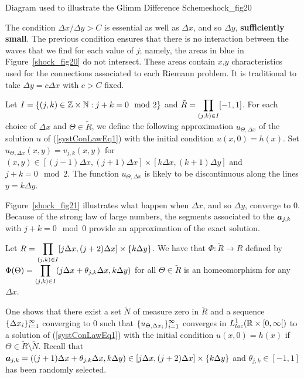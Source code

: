 {Diagram used to illustrate the Glimm Difference Scheme}{shock_fig20}

The condition $\Delta x / \Delta y > C$ is essential as well as
$\Delta x$, and so $\Delta y$, {\bfseries sufficiently small}.
The previous condition ensures that there is no interaction between
the waves that we find for each value of $j$; namely, the areas
in blue in Figure~\ref{shock_fig20} do not intersect.  These areas contain
$x$,$y$ characteristics used for the connections associated to each
Riemann problem.  It is traditional to take $\Delta y = c \Delta x$ with
$c>C$ fixed.

Let $I = \{ (j,k) \in \mathbb{Z} \times \mathbb{N} : j+k = 0 \mod{2} \}$ and
$\displaystyle \tilde{R} = \prod_{(j,k) \in I} [-1,1]$.
For each choice of $\Delta x$ and $\Theta \in \tilde{R}$, we
define the following approximation $u_{\Theta, \Delta x}$ of the solution $u$ of
(\ref{systConLawEq1}) with the initial condition $u(x,0) = h(x)$.
Set $u_{\Theta,\Delta x}(x,y) = v_{j,k}(x,y)$ for
$(x,y) \in [(j-1)\Delta x, (j+1)\Delta x]\times [k\Delta x,(k+1)\Delta y]$
and $j+k = 0 \mod{2}$.  The function $u_{\Theta,\Delta x}$ is likely
to be discontinuous along the lines $y = k \Delta y$.

Figure~\ref{shock_fig21} illustrates what happen when $\Delta x$, and
so $\Delta y$, converge to $0$.  Because of the strong law of large numbers,
the segments associated to the ${\bm{a}}_{j,k}$ with $j+k =0 \mod{0}$
provide an approximation of the exact solution.


Let $\displaystyle R = \prod_{(j,k) \in I} [j\Delta x,(j+2) \Delta x]
\times \{k \Delta y\}$.  We have that $\Phi:\tilde{R} \to R$
defined by $\displaystyle \Phi(\Theta) =
\prod_{(j,k) \in I} (j\Delta x + \theta_{j,k} \Delta x, k \Delta y)$
for all $\Theta \in \tilde{R}$ is an homeomorphism 
for any $\Delta x$.

One shows that there exist a set $\tilde{N}$ of measure zero in
$\tilde{R}$ and a sequence $\displaystyle \{ \Delta x_i\}_{i=1}^\infty$
converging to $0$ such that
$\displaystyle \{u_{\Theta,\Delta x_i}\}_{i=1}^\infty$ converges in
$\displaystyle L^1_{loc}(\mathbb{R}\times [0,\infty[)$ to a solution of
(\ref{systConLawEq1}) with the initial condition $u(x,0) = h(x)$ if
$\Theta \in \tilde{R}\setminus \tilde{N}$.
Recall that
${\bm{a}}_{j,k} = ((j+1)\Delta x + \theta_{j,k} \Delta x, k \Delta y)
\in [j\Delta x,(j+2) \Delta x] \times \{k \Delta y\}$
and $\theta_{j,k} \in [-1,1]$ has been randomly selected.

